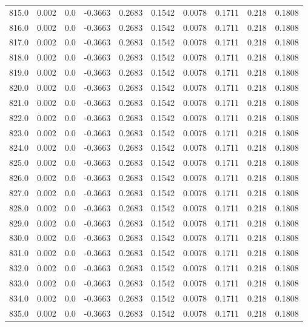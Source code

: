 \begin{longtable}{lrrrrrrrrr}
815.0 & 0.002 & 0.0 & -0.3663 & 0.2683 & 0.1542 & 0.0078 & 0.1711 & 0.218 & 0.1808 \\
816.0 & 0.002 & 0.0 & -0.3663 & 0.2683 & 0.1542 & 0.0078 & 0.1711 & 0.218 & 0.1808 \\
817.0 & 0.002 & 0.0 & -0.3663 & 0.2683 & 0.1542 & 0.0078 & 0.1711 & 0.218 & 0.1808 \\
818.0 & 0.002 & 0.0 & -0.3663 & 0.2683 & 0.1542 & 0.0078 & 0.1711 & 0.218 & 0.1808 \\
819.0 & 0.002 & 0.0 & -0.3663 & 0.2683 & 0.1542 & 0.0078 & 0.1711 & 0.218 & 0.1808 \\
820.0 & 0.002 & 0.0 & -0.3663 & 0.2683 & 0.1542 & 0.0078 & 0.1711 & 0.218 & 0.1808 \\
821.0 & 0.002 & 0.0 & -0.3663 & 0.2683 & 0.1542 & 0.0078 & 0.1711 & 0.218 & 0.1808 \\
822.0 & 0.002 & 0.0 & -0.3663 & 0.2683 & 0.1542 & 0.0078 & 0.1711 & 0.218 & 0.1808 \\
823.0 & 0.002 & 0.0 & -0.3663 & 0.2683 & 0.1542 & 0.0078 & 0.1711 & 0.218 & 0.1808 \\
824.0 & 0.002 & 0.0 & -0.3663 & 0.2683 & 0.1542 & 0.0078 & 0.1711 & 0.218 & 0.1808 \\
825.0 & 0.002 & 0.0 & -0.3663 & 0.2683 & 0.1542 & 0.0078 & 0.1711 & 0.218 & 0.1808 \\
826.0 & 0.002 & 0.0 & -0.3663 & 0.2683 & 0.1542 & 0.0078 & 0.1711 & 0.218 & 0.1808 \\
827.0 & 0.002 & 0.0 & -0.3663 & 0.2683 & 0.1542 & 0.0078 & 0.1711 & 0.218 & 0.1808 \\
828.0 & 0.002 & 0.0 & -0.3663 & 0.2683 & 0.1542 & 0.0078 & 0.1711 & 0.218 & 0.1808 \\
829.0 & 0.002 & 0.0 & -0.3663 & 0.2683 & 0.1542 & 0.0078 & 0.1711 & 0.218 & 0.1808 \\
830.0 & 0.002 & 0.0 & -0.3663 & 0.2683 & 0.1542 & 0.0078 & 0.1711 & 0.218 & 0.1808 \\
831.0 & 0.002 & 0.0 & -0.3663 & 0.2683 & 0.1542 & 0.0078 & 0.1711 & 0.218 & 0.1808 \\
832.0 & 0.002 & 0.0 & -0.3663 & 0.2683 & 0.1542 & 0.0078 & 0.1711 & 0.218 & 0.1808 \\
833.0 & 0.002 & 0.0 & -0.3663 & 0.2683 & 0.1542 & 0.0078 & 0.1711 & 0.218 & 0.1808 \\
834.0 & 0.002 & 0.0 & -0.3663 & 0.2683 & 0.1542 & 0.0078 & 0.1711 & 0.218 & 0.1808 \\
835.0 & 0.002 & 0.0 & -0.3663 & 0.2683 & 0.1542 & 0.0078 & 0.1711 & 0.218 & 0.1808 \\

\end{longtable}
